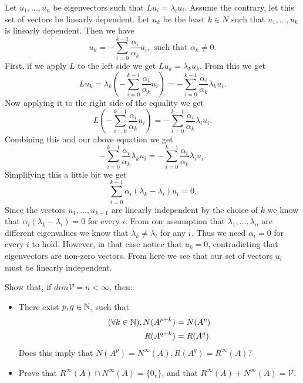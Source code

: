 \documentclass{article}
\begin{document}
\begin{solution}
  Let $u_1, \ldots, u_n$ be eigenvectors such that $Lu_i = \lambda_i u_i$.
  Assume the contrary, let this set of vectors be linearly dependent.
  Let $u_k$ be the least $k \in N$ such that $u_1, \ldots, u_k$ is linearly dependent.
  Then we have
  \[u_k = - \sum_{i = 0}^{k - 1} \frac{\alpha_i}{\alpha_k} u_i, \text{ such that $\alpha_k \neq 0$.}\]
  First, if we apply $L$ to the left side we get $Lu_k = \lambda_k u_k$.
  From this we get
  \[Lu_k = \lambda_k (- \sum_{i = 0}^{k - 1} \frac{\alpha_i}{\alpha_k} u_i) = - \sum_{i = 0}^{k - 1} \frac{\alpha_i}{\alpha_k} \lambda_k u_i.\]
  Now applying it to the right side of the equality we get
  \[L(- \sum_{i = 0}^{k - 1} \frac{\alpha_i}{\alpha_k} u_i) = - \sum_{i = 0}^{k - 1} \frac{\alpha_i}{\alpha_k} \lambda_i u_i.\]
  Combining this and our above equation we get
  \[- \sum_{i = 0}^{k - 1} \frac{\alpha_i}{\alpha_k} \lambda_k u_i = - \sum_{i = 0}^{k - 1} \frac{\alpha_i}{\alpha_k} \lambda_i u_i.\]
  Simplifying this a little bit we get
  \[\sum_{i = 0}^{k - 1} \alpha_i (\lambda_k - \lambda_i) u_i = 0.\]
  Since the vectors $u_1, \ldots, u_{k - 1}$ are linearly independent by the choice of $k$ we know that $\alpha_i (\lambda_k - \lambda_i) = 0$ for every $i$.
  From our assumption that $\lambda_1, \ldots, \lambda_n$ are different eigenvalues we know that $\lambda_k \neq \lambda_i$ for any $i$.
  Thus we need $\alpha_i = 0$ for every $i$ to hold.
  However, in that case notice that $u_k = 0$, contradicting that eigenvectors are non-zero vectors.
  From here we see that our set of vectors $u_i$ must be linearly independent.
\end{solution}

\begin{problem}
  Show that, if $dim \mathcal{V} = n < \infty$, then:
  \begin{itemize}
    \item There exist $p, q \in \mathbb{N}$, such that
      \[\begin{aligned}
        (\forall k \in \mathbb{N}), N(A^{p + k}) &= N(A^p)\\
        R(A^{q + k}) &= R(A^q).
      \end{aligned}\]
      Does this imply that $N(A^p) = N^{\infty}(A), R(A^q) = R^{\infty}(A)$?
    \item Prove that $R^{\infty}(A) \cap N^{\infty}(A) = \{0_v\}$, and that $R^{\infty}(A) + N^{\infty}(A) = \mathcal{V}$.
  \end{itemize}
\end{problem}
\end{document}
